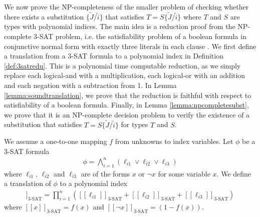We now prove the NP-completeness of the smaller problem of checking whether there exists a substitution $\{\widetilde{J}/\widetilde{i}\}$ that satisfies $T = S\{\widetilde{J}/\widetilde{i}\}$ where $T$ and $S$ are types with polynomial indices. The main idea is a reduction proof from the NP-complete 3-SAT problem, i.e. the satisfiability problem of a boolean formula in conjunctive normal form with exactly three literals in each clause \cite{Karp1972}. We first define a translation from a 3-SAT formula to a polynomial index in Definition \ref{def:3satredu}. This is a polynomial time computable reduction, as we simply replace each logical-and with a multiplication, each logical-or with an addition and each negation with a subtraction from 1. In Lemma \ref{lemma:soundtranslation}, we prove that the reduction is faithful with respect to satisfiability of a boolean formula. Finally, in Lemma \ref{lemma:npcompletesubst}, we prove that it is an NP-complete decision problem to verify the existence of a substitution that satisfies $T = S\{\widetilde{J}/\widetilde{i}\}$ for types $T$ and $S$.
%
\begin{defi}\label{def:3satredu}
We assume a one-to-one mapping $f$ from unknowns to index variables. Let $\phi$ be a 3-SAT formula
\begin{align*}
    \phi = \bigwedge_{i=1}^n \left(\ell_{i1} \lor \ell_{i2} \lor \ell_{i3}\right)%
\end{align*}
where $\ell_{i1}$, $\ell_{i2}$ and $\ell_{i3}$ are of the forms $x$ or $\neg x$ for some variable $x$. We define a translation of $\phi$ to a polynomial index %
\begin{align*}
    [\![\phi]\!]_{\text{3-SAT}} = \prod_{i=1}^n \left([\![\ell_{i1}]\!]_{\text{3-SAT}} + [\![\ell_{i2}]\!]_{\text{3-SAT}} + [\![\ell_{i3}]\!]_{\text{3-SAT}}\right) %
\end{align*}
where $[\![x]\!]_{\text{3-SAT}} = f(x)$ and $[\![\neg x]\!]_{\text{3-SAT}} = (1 - f(x))$.
\end{defi}


